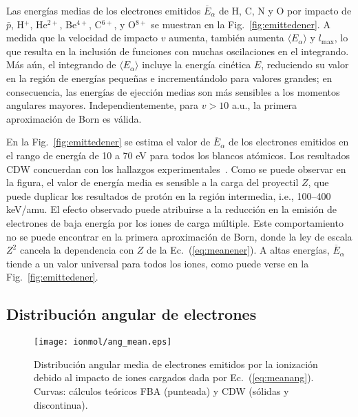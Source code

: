 Las energías medias de los electrones emitidos $\overline{E}_{\alpha}$ 
de H, C, N y O por impacto de $\bar{p}$, H$^{+}$, He$^{2+}$, Be$^{4+}$, 
C$^{6+}$, y O$^{8+}$ se muestran en la Fig.~\ref{fig:emittedener}. 
A medida que la velocidad de impacto $v$ aumenta, también aumenta 
$\langle E_{\alpha}\rangle$ y $l_{\max}$, lo que resulta en la inclusión 
de funciones con muchas oscilaciones en el integrando. Más aún, el 
integrando de $\langle E_{\alpha}\rangle$ incluye la energía cinética 
$E$, reduciendo su valor en la región de energías pequeñas e 
incrementándolo para valores grandes; en consecuencia, las energías de
ejección medias son más sensibles a los momentos angulares mayores. 
Independientemente, para $v>10$ a.u., la primera aproximación de Born 
es válida. 

En la Fig.~\ref{fig:emittedener} se estima el valor de 
$\overline{E}_{\alpha}$ de los electrones emitidos en el rango de 
energía de 10 a 70 eV para todos los blancos atómicos. Los resultados CDW 
concuerdan con los hallazgos experimentales~\cite{Surdutovic:18}. Como 
se puede observar en la figura, el valor de energía media es 
sensible a la carga del proyectil $Z$, que puede duplicar los resultados 
de protón en la región intermedia, i.e., 100--400 keV/amu. El efecto 
observado puede atribuirse a la reducción en la emisión de electrones de 
baja energía por los iones de carga múltiple. Este comportamiento no se 
puede encontrar en la primera aproximación de Born, donde la ley de 
escala $Z^2$ cancela la dependencia con $Z$ de la 
Ec.~(\ref{eq:meanener}). A altas energías, $\overline{E}_{\alpha}$ 
tiende a un valor universal para todos los iones, como puede verse en la 
Fig.~\ref{fig:emittedener}.

\subsection{Distribución angular de electrones}
\label{subsec:meanang}

\begin{figure}
\centering
\texttt{[image: ionmol/ang\_mean.eps]}
\caption[Distribución angular media de electrones emitidos.]
{Distribución angular media de electrones emitidos por la ionización 
debido al impacto de iones cargados dada por Ec.~(\ref{eq:meanang}). 
Curvas: cálculos teóricos FBA (punteada) y CDW (sólidas y 
discontinua).}
\label{fig:emittedang}
\end{figure} 

